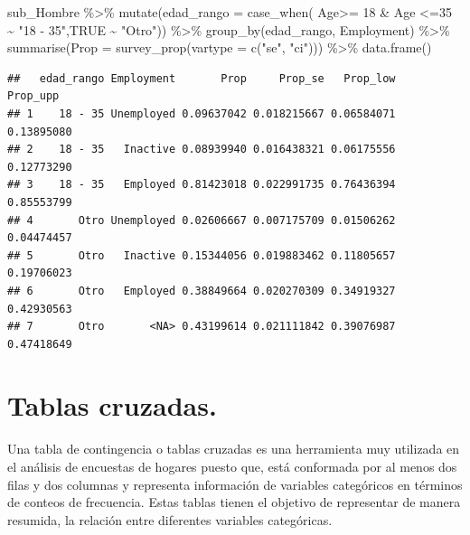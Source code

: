 \documentclass[
  12pt,
]{book}
\newenvironment{Shaded}{\begin{snugshade}}{\end{snugshade}}
\newcommand{\AttributeTok}[1]{\textcolor[rgb]{0.77,0.63,0.00}{#1}}
\newcommand{\ConstantTok}[1]{\textcolor[rgb]{0.00,0.00,0.00}{#1}}
\newcommand{\DecValTok}[1]{\textcolor[rgb]{0.00,0.00,0.81}{#1}}
\newcommand{\FunctionTok}[1]{\textcolor[rgb]{0.00,0.00,0.00}{#1}}
\newcommand{\NormalTok}[1]{#1}
\newcommand{\SpecialCharTok}[1]{\textcolor[rgb]{0.00,0.00,0.00}{#1}}
\newcommand{\StringTok}[1]{\textcolor[rgb]{0.31,0.60,0.02}{#1}}
\begin{document}
\begin{Shaded}
\begin{Highlighting}[]
\NormalTok{sub\_Hombre }\SpecialCharTok{\%\textgreater{}\%} \FunctionTok{mutate}\NormalTok{(}\AttributeTok{edad\_rango =} \FunctionTok{case\_when}\NormalTok{(}
\NormalTok{                      Age}\SpecialCharTok{\textgreater{}=} \DecValTok{18} \SpecialCharTok{\&}\NormalTok{ Age }\SpecialCharTok{\textless{}=}\DecValTok{35}  \SpecialCharTok{\textasciitilde{}} \StringTok{"18 {-} 35"}\NormalTok{,}\ConstantTok{TRUE} \SpecialCharTok{\textasciitilde{}} \StringTok{"Otro"}\NormalTok{)) }\SpecialCharTok{\%\textgreater{}\%}
                      \FunctionTok{group\_by}\NormalTok{(edad\_rango, Employment) }\SpecialCharTok{\%\textgreater{}\%} 
                      \FunctionTok{summarise}\NormalTok{(}\AttributeTok{Prop =} \FunctionTok{survey\_prop}\NormalTok{(}\AttributeTok{vartype =}  \FunctionTok{c}\NormalTok{(}\StringTok{"se"}\NormalTok{, }\StringTok{"ci"}\NormalTok{))) }\SpecialCharTok{\%\textgreater{}\%} 
                      \FunctionTok{data.frame}\NormalTok{()}
\end{Highlighting}
\end{Shaded}

\begin{verbatim}
##   edad_rango Employment       Prop     Prop_se   Prop_low   Prop_upp
## 1    18 - 35 Unemployed 0.09637042 0.018215667 0.06584071 0.13895080
## 2    18 - 35   Inactive 0.08939940 0.016438321 0.06175556 0.12773290
## 3    18 - 35   Employed 0.81423018 0.022991735 0.76436394 0.85553799
## 4       Otro Unemployed 0.02606667 0.007175709 0.01506262 0.04474457
## 5       Otro   Inactive 0.15344056 0.019883462 0.11805657 0.19706023
## 6       Otro   Employed 0.38849664 0.020270309 0.34919327 0.42930563
## 7       Otro       <NA> 0.43199614 0.021111842 0.39076987 0.47418649
\end{verbatim}

\hypertarget{tablas-cruzadas.}{%
\section{Tablas cruzadas.}\label{tablas-cruzadas.}}

Una tabla de contingencia o tablas cruzadas es una herramienta muy utilizada en el análisis de encuestas de hogares puesto que, está conformada por al menos dos filas y dos columnas y representa información de variables categóricos en términos de conteos de frecuencia. Estas tablas tienen el objetivo de representar de manera resumida, la relación entre diferentes variables categóricas.
\end{document}

